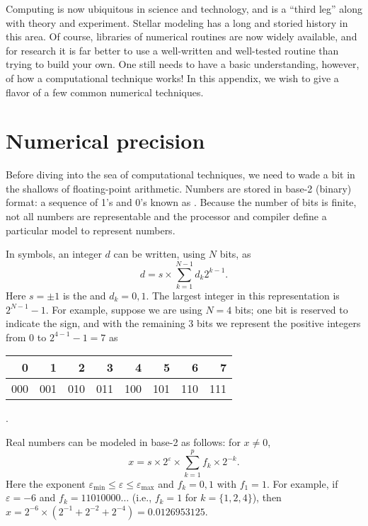 
Computing is now ubiquitous in science and technology, and is a ``third leg'' along with theory and experiment. Stellar modeling has a long and storied history in this area. Of course, libraries of numerical routines are now widely available, and for research it is far better to use a well-written and well-tested routine than trying to build your own. One still needs to have a basic understanding, however, of how a computational technique works! In this appendix, we wish to give a flavor of a few common numerical techniques. 

\section{Numerical precision}\label{s.numerical-precision}
Before diving into the sea of computational techniques, we need to wade a bit in the shallows of floating-point arithmetic. Numbers are stored in base-2 (binary) format: a sequence of 1's and 0's known as . Because the number of bits is finite, not all numbers are representable and the processor and compiler define a particular model to represent numbers.

In symbols, an integer $d$ can be written, using $N$ bits, as
\[
d = s\times\sum_{k=1}^{N-1} d_{k}2^{k-1}.
\]
Here $s=\pm1$ is the  and $d_{k} = 0,1$. The largest integer in this representation is $2^{N-1}-1$. For example, suppose we are using $N=4$ bits; one bit is reserved to indicate the sign, and with the remaining 3 bits we represent the positive integers from $0$ to $2^{4-1}-1 = 7$ as
\begin{tabular}{rrrrrrrr}
0 & 1 & 2 & 3 & 4 & 5 & 6 & 7\\
\hline
000 & 001 & 010 & 011 & 100 & 101 & 110 & 111
\end{tabular}.

Real numbers can be modeled in base-2 as follows\cite{Metcalf2018Modern-Fortran-}: for $x \neq 0$, 
\begin{equation}\label{e.modal-reals}
x = s\times 2^{\varepsilon}\times \sum_{k=1}^{p} f_{k}\times 2^{-k}.
\end{equation}
Here the exponent $\varepsilon_{\min}\le\varepsilon\le\varepsilon_{\max}$ and $f_{k}=0,1$ with $f_{1} = 1$. For example, if $\varepsilon=-6$ and $f_{k} = 11010000\ldots$ (i.e., $f_{k}=1$ for $k=\{1,2,4\}$), then
$x = 2^{-6}\times (2^{-1}+2^{-2}+2^{-4}) = 0.0126953125$.

